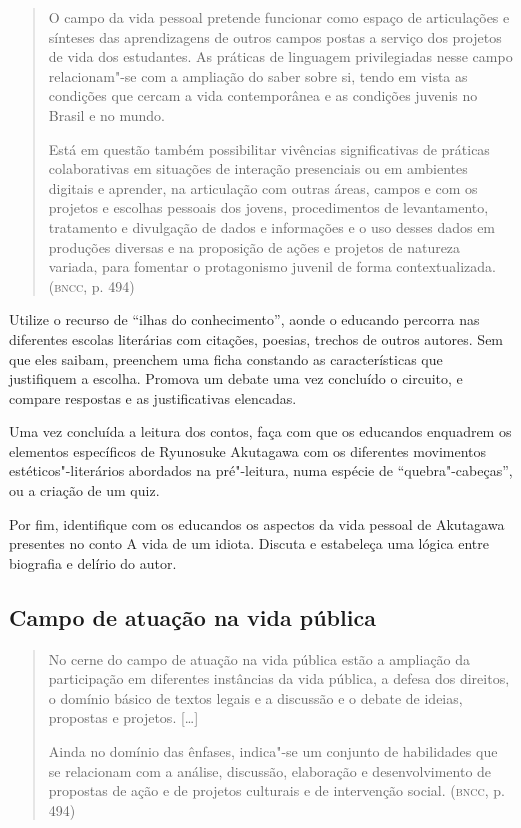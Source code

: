\documentclass[12pt]{extarticle}
\begin{document}
\begin{quote}
O campo da vida pessoal pretende funcionar como espaço de articulações
e sínteses das aprendizagens de outros campos postas a serviço dos
projetos de vida dos estudantes. As práticas de linguagem privilegiadas
nesse campo relacionam"-se com a ampliação do saber sobre si, tendo em
vista as condições que cercam a vida contemporânea e as condições
juvenis no Brasil e no mundo.

Está em questão também possibilitar vivências significativas de práticas
colaborativas em situações de interação presenciais ou em ambientes
digitais e aprender, na articulação com outras áreas, campos e com os
projetos e escolhas pessoais dos jovens, procedimentos de levantamento,
tratamento e divulgação de dados e informações e o uso desses dados em
produções diversas e na proposição de ações e projetos de natureza
variada, para fomentar o protagonismo juvenil de forma
contextualizada. (\textsc{bncc}, p. 494)
\end{quote}

Utilize o recurso de ``ilhas do conhecimento'', aonde o educando
percorra nas diferentes escolas literárias com citações, poesias,
trechos de outros autores. Sem que eles saibam, preenchem uma ficha
constando as características que justifiquem a escolha. Promova um
debate uma vez concluído o circuito, e compare respostas e as
justificativas elencadas.

Uma vez concluída a leitura dos contos, faça com que os educandos
enquadrem os elementos específicos de Ryunosuke Akutagawa com os
diferentes movimentos estéticos"-literários abordados na pré"-leitura,
numa espécie de ``quebra"-cabeças'', ou a criação de um quiz.

Por fim, identifique com os educandos os aspectos da vida pessoal de
Akutagawa presentes no conto A vida de um idiota. Discuta e estabeleça
uma lógica entre biografia e delírio do autor.

\subsection{Campo de atuação na vida pública}

\begin{quote}
No cerne do campo de atuação na vida pública estão a ampliação da
participação em diferentes instâncias da vida pública, a defesa dos
direitos, o domínio básico de textos legais e a discussão e o debate de
ideias, propostas e projetos. {[}\ldots{}{]}

Ainda no domínio das ênfases, indica"-se um conjunto de habilidades que
se relacionam com a análise, discussão, elaboração e desenvolvimento de
propostas de ação e de projetos culturais e de intervenção social.
(\textsc{bncc}, p. 494)
\end{quote}
\end{document}
